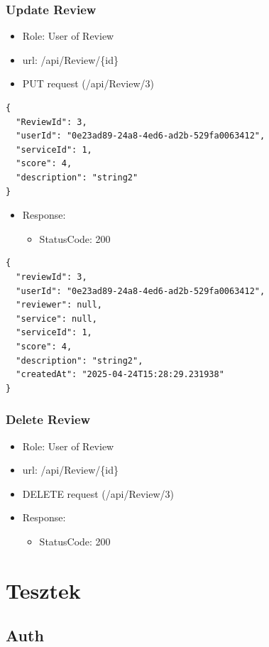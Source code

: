 \documentclass[11pt]{article}
\begin{document}
\subsubsection{Update Review}
\label{sec:orgd678439}
\begin{itemize}
\item Role: User of Review
\item url: /api/Review/\{id\}
\item PUT request (/api/Review/3)
\end{itemize}
\begin{verbatim}
{
  "ReviewId": 3,
  "userId": "0e23ad89-24a8-4ed6-ad2b-529fa0063412",
  "serviceId": 1,
  "score": 4,
  "description": "string2"
}
\end{verbatim}
\begin{itemize}
\item Response:
\begin{itemize}
\item StatusCode: 200
\end{itemize}
\end{itemize}
\begin{verbatim}
{
  "reviewId": 3,
  "userId": "0e23ad89-24a8-4ed6-ad2b-529fa0063412",
  "reviewer": null,
  "service": null,
  "serviceId": 1,
  "score": 4,
  "description": "string2",
  "createdAt": "2025-04-24T15:28:29.231938"
}
\end{verbatim}
\subsubsection{Delete Review}
\label{sec:org37f5930}
\begin{itemize}
\item Role: User of Review
\item url: /api/Review/\{id\}
\item DELETE request (/api/Review/3)
\item Response:
\begin{itemize}
\item StatusCode: 200
\end{itemize}
\end{itemize}
\section{Tesztek}
\label{sec:orge670ecc}
\subsection{Auth}
\label{sec:org9c45536}
\end{document}
